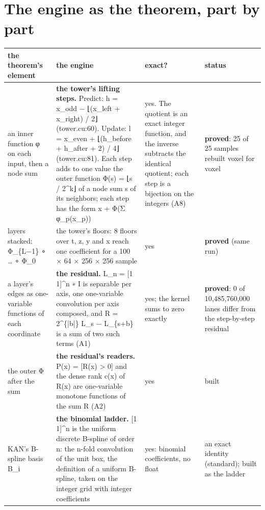 \section{\texorpdfstring{The engine as the theorem, part by part}{The engine as the theorem, part by part}}

{\footnotesize
\setlength{\tabcolsep}{6pt}
\begin{longtable}{>{\RaggedRight\arraybackslash}p{}>{\RaggedRight\arraybackslash}p{}>{\RaggedRight\arraybackslash}p{}>{\RaggedRight\arraybackslash}p{}}
\toprule
the theorem's element & the engine & exact? & status \\
\midrule
\endhead
an inner function φ on each input, then a node sum & \textbf{the tower's lifting steps.} Predict: h = x\_\allowbreak{}odd − ⌊(x\_\allowbreak{}left + x\_\allowbreak{}right) / 2⌋ (tower.cu:60). Update: l = x\_\allowbreak{}even + ⌊(h\_\allowbreak{}before + h\_\allowbreak{}after + 2) / 4⌋ (tower.cu:81). Each step adds to one value the outer function Φ(s) = ⌊s / 2\textasciicircum{}k⌋ of a node sum s of its neighbors; each step has the form x + Φ(Σ φ\_\allowbreak{}p(x\_\allowbreak{}p)) & yes. The quotient is an exact integer function, and the inverse subtracts the identical quotient; each step is a bijection on the integers (A8) & \textbf{proved}: 25 of 25 samples rebuilt voxel for voxel \\
layers stacked: Φ\_\allowbreak{}\{L−1\} ∘ … ∘ Φ\_\allowbreak{}0 & the tower's floors: 8 floors over t, z, y and x reach one coefficient for a 100 × 64 × 256 × 256 sample & yes & \textbf{proved} (same run) \\
a layer's edges as one-variable functions of each coordinate & \textbf{the residual.} L\_\allowbreak{}n = [1 1]\textasciicircum{}n ∗ I is separable per axis, one one-variable convolution per axis composed, and R = 2\textasciicircum{}\{|b|\} L\_\allowbreak{}s − L\_\allowbreak{}\{s+b\} is a sum of two such terms (A1) & yes; the kernel sums to zero exactly & \textbf{proved}: 0 of 10,485,760,000 lanes differ from the step-by-step residual \\
the outer Φ after the sum & \textbf{the residual's readers.} P(x) = [R(x) > 0] and the dense rank c(x) of R(x) are one-variable monotone functions of the sum R (A2) & yes & built \\
KAN's B-spline basis B\_\allowbreak{}i & \textbf{the binomial ladder.} [1 1]\textasciicircum{}n is the uniform discrete B-spline of order n: the n-fold convolution of the unit box, the definition of a uniform B-spline, taken on the integer grid with integer coefficients & yes: binomial coefficients, no float & an exact identity (standard); built as the ladder \\

\end{longtable}}
